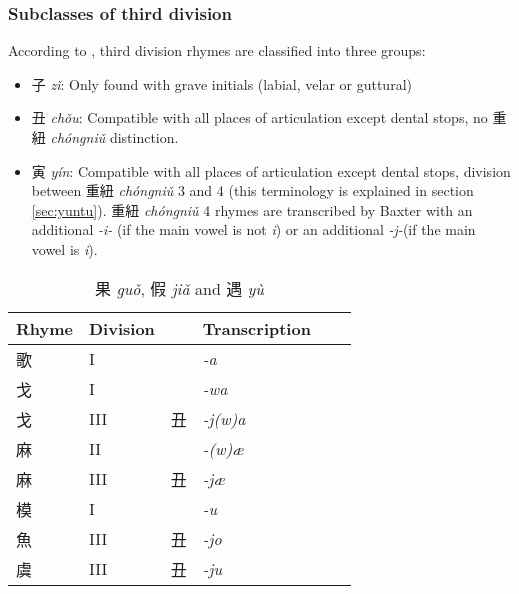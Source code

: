 \documentclass[oneside,a4paper,11pt]{article}
\newcommand{\ipa}[1]{{\phon\textit{#1}}}
\newcommand{\zh}[1]{{\cn #1}}
\newcommand{\zhc}[2]{\zh{#1} \ipa{#2}}
\begin{document}
\subsubsection{Subclasses of third division} \label{sec:third}

According to \citet{lirong56qy}, third division rhymes are classified into three groups:

\begin{itemize}
\item \zhc{子}{zǐ}: Only found with grave initials (labial, velar or guttural)
\item \zhc{丑}{chǒu}: Compatible with all places of articulation except dental stops, no \zhc{重紐}{chóngniǔ} distinction.
\item \zhc{寅}{yín}: Compatible with all places of articulation except dental stops, division between \zhc{重紐}{chóngniǔ} 3 and 4 (this terminology is explained in section \ref{sec:yuntu}). \zhc{重紐}{chóngniǔ} 4 rhymes are transcribed by Baxter with an additional \ipa{-i-} (if the main vowel is not \ipa{i}) or an additional \ipa{-j-}(if the main vowel is \ipa{i}).
\end{itemize} 

\begin{table}[H]
\caption{\zhc{果}{guǒ}, \zhc{假}{jiǎ} and \zhc{遇}{yù}} \centering \label{tab:guo}
\begin{tabular}{llllll}
\toprule
Rhyme & Division & & Transcription \\
\midrule
\zh{歌} &	I &	&	\ipa{-a} &	\\
\zh{戈} &	I &	&	\ipa{-wa} &	\\
\zh{戈} &	III &	\zh{丑} &	\ipa{-j(w)a} &	\\
\midrule
\zh{麻} &	II &	&	\ipa{-(w)æ} &	\\
\zh{麻} &	III &	\zh{丑} &	\ipa{-jæ} &	\\
\midrule
\zh{模} &	I &	&	\ipa{-u} &	\\
\zh{魚} &	III &	\zh{丑} &	\ipa{-jo} &	\\
\zh{虞} &	III &	\zh{丑} &	\ipa{-ju} &	\\
\bottomrule
\end{tabular}
\end{table}
\end{document}
